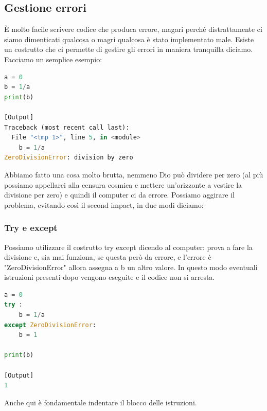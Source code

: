 \documentclass[10pt,a4paper]{article}
\begin{document}
\subsection{Gestione errori}
È molto facile scrivere codice che produca errore, magari perché distrattamente ci siamo dimenticati qualcosa o magri qualcosa è stato implementato male. Esiste un costrutto che ci permette di gestire gli errori in maniera tranquilla diciamo. Facciamo un semplice esempio:

\begin{lstlisting}[language=Python]
a = 0
b = 1/a
print(b)

[Output]
Traceback (most recent call last):
  File "<tmp 1>", line 5, in <module>
    b = 1/a
ZeroDivisionError: division by zero
\end{lstlisting}
Abbiamo fatto una cosa molto brutta, nemmeno Dio può dividere per zero (al più possiamo appellarci alla censura cosmica e mettere un'orizzonte a vestire la divisione per zero) e quindi il computer ci da errore. Possiamo aggirare il problema, evitando così il second impact, in due modi diciamo:
\subsubsection{Try e except}
Possiamo utilizzare il costrutto try except dicendo al computer: prova a fare la divisione e, sia mai funziona, se questa però da errore, e l'errore è "ZeroDivisionError" allora assegna a b un altro valore. In questo modo eventuali istruzioni presenti dopo vengono eseguite e il codice non si arresta.
\begin{lstlisting}[language=Python]
a = 0
try :
    b = 1/a
except ZeroDivisionError:
    b = 1
    
print(b)

[Output]
1
\end{lstlisting}
Anche qui è fondamentale indentare il blocco delle istruzioni.
\end{document}
